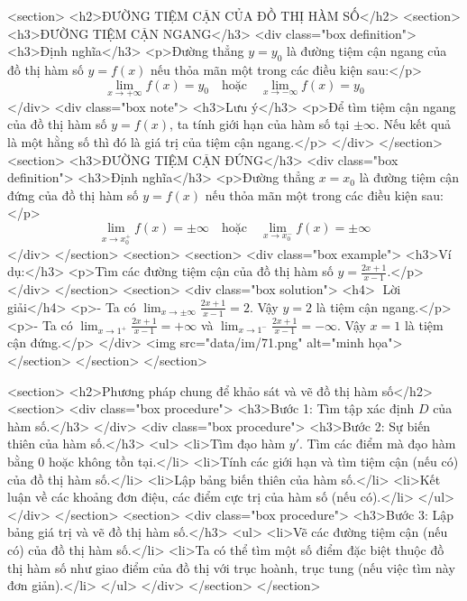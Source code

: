 <section>
    <h2>ĐƯỜNG TIỆM CẬN CỦA ĐỒ THỊ HÀM SỐ</h2>
    <section>
        <h3>ĐƯỜNG TIỆM CẬN NGANG</h3>
        <div class="box definition">
            <h3>Định nghĩa</h3>
            <p>Đường thẳng \(y=y_0\) là đường tiệm cận ngang của đồ thị hàm số \(y=f(x)\) nếu thỏa mãn một trong các điều kiện sau:</p>
            \[\lim_{x \to +\infty} f(x) = y_0 \quad \text{hoặc} \quad \lim_{x \to -\infty} f(x) = y_0\]
        </div>
        <div class="box note">
            <h3>Lưu ý</h3>
            <p>Để tìm tiệm cận ngang của đồ thị hàm số \(y=f(x)\), ta tính giới hạn của hàm số tại \(\pm\infty\). Nếu kết quả là một hằng số thì đó là giá trị của tiệm cận ngang.</p>
        </div>
    </section>
    <section>
        <h3>ĐƯỜNG TIỆM CẬN ĐỨNG</h3>
        <div class="box definition">
            <h3>Định nghĩa</h3>
            <p>Đường thẳng \(x=x_0\) là đường tiệm cận đứng của đồ thị hàm số \(y=f(x)\) nếu thỏa mãn một trong các điều kiện sau:</p>
            \[\lim_{x \to x_0^+} f(x) = \pm\infty \quad \text{hoặc} \quad \lim_{x \to x_0^-} f(x) = \pm\infty\]
        </div>
    </section>
    <section>
        <section>
            <div class="box example">
                <h3>Ví dụ:</h3>
                <p>Tìm các đường tiệm cận của đồ thị hàm số \(y = \frac{2x+1}{x-1}\).</p>
            </div>
        </section>
        <section>
            <div class="box solution">
                <h4>📝 Lời giải</h4>
                <p>- Ta có \(\lim_{x \to \pm\infty} \frac{2x+1}{x-1} = 2\). Vậy \(y=2\) là tiệm cận ngang.</p>
                <p>- Ta có \(\lim_{x \to 1^+} \frac{2x+1}{x-1} = +\infty\) và \(\lim_{x \to 1^-} \frac{2x+1}{x-1} = -\infty\). Vậy \(x=1\) là tiệm cận đứng.</p>
            </div>
            <img src="data/im/71.png" alt="minh họa">
        </section>
    </section>
</section>

<section>
    <h2>Phương pháp chung để khảo sát và vẽ đồ thị hàm số</h2>
    <section>
        <div class="box procedure">
            <h3>Bước 1: Tìm tập xác định \(D\) của hàm số.</h3>
        </div>
        <div class="box procedure">
            <h3>Bước 2: Sự biến thiên của hàm số.</h3>
            <ul>
                <li>Tìm đạo hàm \(y'\). Tìm các điểm mà đạo hàm bằng 0 hoặc không tồn tại.</li>
                <li>Tính các giới hạn và tìm tiệm cận (nếu có) của đồ thị hàm số.</li>
                <li>Lập bảng biến thiên của hàm số.</li>
                <li>Kết luận về các khoảng đơn điệu, các điểm cực trị của hàm số (nếu có).</li>
            </ul>
        </div>
    </section>
    <section>
        <div class="box procedure">
            <h3>Bước 3: Lập bảng giá trị và vẽ đồ thị hàm số.</h3>
            <ul>
                <li>Vẽ các đường tiệm cận (nếu có) của đồ thị hàm số.</li>
                <li>Ta có thể tìm một số điểm đặc biệt thuộc đồ thị hàm số như giao điểm của đồ thị với trục hoành, trục tung (nếu việc tìm này đơn giản).</li>
            </ul>
        </div>
    </section>
</section>

